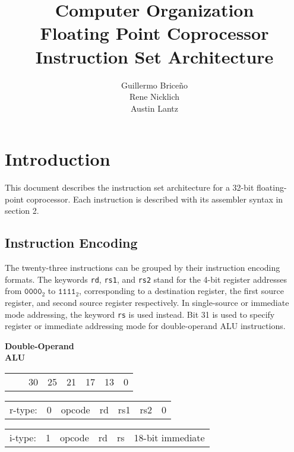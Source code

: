 \documentclass{article}
\title{
	\vspace{2in}
	\textmd{Computer Organization \\ Floating Point Coprocessor}\\
	\vspace{1cm}
	\textmd{\textbf{Instruction Set Architecture}}
	\vspace{5cm}
}
\author{Guillermo Brice\~{n}o \\ Rene Nicklich \\ Austin Lantz}
\begin{document}
\maketitle

\pagebreak

\section{Introduction}
This document describes the instruction set architecture for a 32-bit floating-point coprocessor. Each instruction is described with its assembler syntax in section 2.\\

\subsection{Instruction Encoding}
The twenty-three instructions can be grouped by their instruction encoding formats. The keywords \texttt{rd}, \texttt{rs1}, and \texttt{rs2} stand for the 4-bit register addresses from $\texttt{0000}_2$ to $\texttt{1111}_2$, corresponding to a destination register, the first source register, and second source register respectively. In single-source or immediate mode addressing, the keyword \texttt{rs} is used instead. Bit 31 is used to specify register or immediate addressing mode for double-operand ALU instructions.

\normalsize
\bigskip

\begin{minipage}[t]{0.3\textwidth}
	\begin{center}
		\medskip
		\textbf{Double-Operand\\ ALU}
	\end{center}
\end{minipage}
\begin{minipage}[t]{110mm}
	\begin{tabular}{p{12mm}p{2.5mm}p{13mm}p{10mm}p{10mm}p{10mm}p{22.5mm}R{22.5mm}}
		& \footnotesize{} & \footnotesize{30} & \footnotesize{25} & \footnotesize{21} & \footnotesize{17} & \footnotesize{13} & \footnotesize{0} \\ 
	\end{tabular} 

	\begin{tabular}{p{12mm}|C{2.5mm}|C{12.5mm}|C{10mm}|C{10mm}|C{10mm}|C{45mm}|}
		r-type: & 0 & opcode & rd & rs1 & rs2 & 0\\ 
	\end{tabular} 
	
	\medskip

	\begin{tabular}{p{12mm}|C{2.5mm}|C{12.5mm}|C{10mm}|C{10mm}|C{55.15mm}|}
		i-type: & 1 & opcode & rd & rs & 18-bit immediate \\
	\end{tabular}
\end{minipage}
\end{document}
